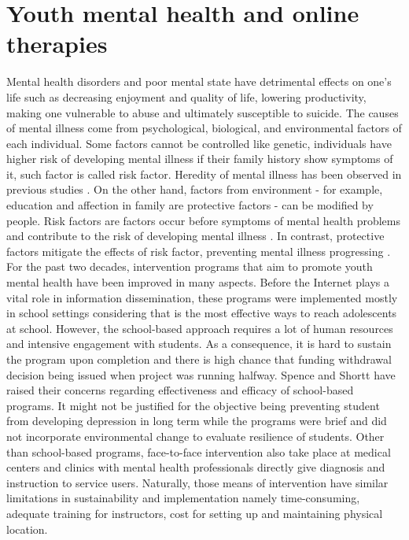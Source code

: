 \section{Youth mental health and online therapies}
Mental health disorders and poor mental state have detrimental effects on one's life such as decreasing enjoyment and quality of life, lowering productivity, making one vulnerable to abuse and ultimately susceptible to suicide. The causes of mental illness come from psychological, biological, and environmental factors of each individual. Some factors cannot be controlled like genetic, individuals have higher risk of developing mental illness if their family history show symptoms of it, such factor is called risk factor. Heredity of mental illness has been observed in previous studies \cite{Hyman2000}. On the other hand, factors from environment - for example, education and affection in family are protective factors - can be modified by people. Risk factors are factors occur before symptoms of mental health problems and contribute to the risk of developing mental illness \cite{KAZDIN1997375}. In contrast, protective factors mitigate the effects of risk factor, preventing mental illness progressing \cite{shortt_spence_2006}. \\
For the past two decades, intervention programs that aim to promote youth mental health have been improved in many aspects. Before the Internet plays a vital role in information dissemination, these programs were implemented mostly in school settings considering that is the most effective ways to reach adolescents at school. However, the school-based approach requires a lot of human resources and intensive engagement with students. As a consequence, it is hard to sustain the program upon completion and there is high chance that funding withdrawal decision being issued when project was running halfway. Spence and Shortt \cite{JCPP:JCPP1738} have raised their concerns regarding effectiveness and efficacy of school-based programs. It might not be justified for the objective being preventing student from developing depression in long term while the programs were brief and did not incorporate environmental change to evaluate resilience of students. Other than school-based programs, face-to-face intervention also take place at medical centers and clinics with mental health professionals directly give diagnosis and instruction to service users. Naturally, those means of intervention have similar limitations in sustainability and implementation namely time-consuming, adequate training for instructors, cost for setting up and maintaining physical location.\\

